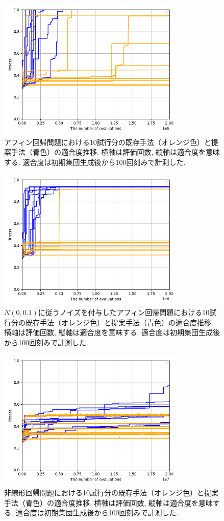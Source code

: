 \documentclass[11pt,oneside,openany,report]{jsbook}
\begin{document}
\begin{figure}[H]
  \centering
  \includegraphics[width=9cm]{exp/affine_regression.png}
  \caption{アフィン回帰問題における10試行分の既存手法（オレンジ色）と提案手法（青色）の適合度推移. 横軸は評価回数, 縦軸は適合度を意味する. 適合度は初期集団生成後から100回刻みで計測した.}
  \label{fig:exp:result:affine_regression}
\end{figure}

\begin{figure}[H]
  \centering
  \includegraphics[width=9cm]{exp/noisy_affine_regression.png}
  \caption{$N(0,0.1)$に従うノイズを付与したアフィン回帰問題における10試行分の既存手法（オレンジ色）と提案手法（青色）の適合度推移. 横軸は評価回数, 縦軸は適合度を意味する. 適合度は初期集団生成後から100回刻みで計測した.}
  \label{fig:exp:result:noisy_affine_regression}
\end{figure}

\begin{figure}[H]
  \centering
  \includegraphics[width=9cm]{exp/two_layers_nn_regression.png}
  \caption{非線形回帰問題における10試行分の既存手法（オレンジ色）と提案手法（青色）の適合度推移. 横軸は評価回数, 縦軸は適合度を意味する. 適合度は初期集団生成後から100回刻みで計測した.}
  \label{fig:exp:result:two_layers_nn_regression}
\end{figure}
\end{document}
